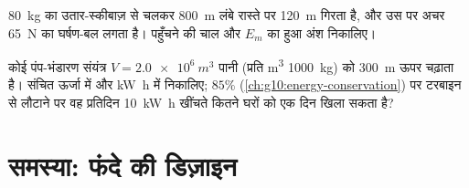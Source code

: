 \begin{exercise}[$\star\star\star$]\label{exo:g11:mechanical-energy:14}
\qty{80}{kg} का उतार-स्कीबाज़  से चलकर \qty{800}{m} लंबे रास्ते पर \qty{120}{m} गिरता
है, और उस पर अचर \qty{65}{N} का घर्षण-बल लगता है। पहुँचने की
चाल और $E_m$ का  हुआ अंश निकालिए।
\end{exercise}

\begin{exercise}[$\star\star\star$]\label{exo:g11:mechanical-energy:15}
कोई पंप-भंडारण संयंत्र $V = \qty{2.0e6}{m^3}$ पानी (प्रति \unit{m^3} \qty{1000}{kg}) को \qty{300}{m} ऊपर
चढ़ाता है। संचित ऊर्जा  में और \unit{kW.h} में निकालिए;
$85\%$  (\cref{ch:g10:energy-conservation}) पर टरबाइन से लौटाने पर वह प्रतिदिन
\qty{10}{kW.h} खींचते कितने घरों को एक दिन खिला सकता है?
\end{exercise}

\section{समस्या: फंदे की डिज़ाइन}

